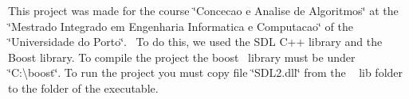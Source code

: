 This project was made for the course \char`\"{}\+Concecao e Analise de Algoritmos\char`\"{} at the~\newline
\char`\"{}\+Mestrado Integrado em Engenharia Informatica e Computacao\char`\"{} of the \char`\"{}\+Universidade do Porto\char`\"{}.~\newline
To do this, we used the S\+D\+L C++ library and the Boost library. To compile the project the boost~\newline
library must be under \char`\"{}\+C\+:\textbackslash{}boost\char`\"{}. To run the project you must copy file \char`\"{}\+S\+D\+L2.\+dll\char`\"{} from the ~\newline
lib folder to the folder of the executable. 